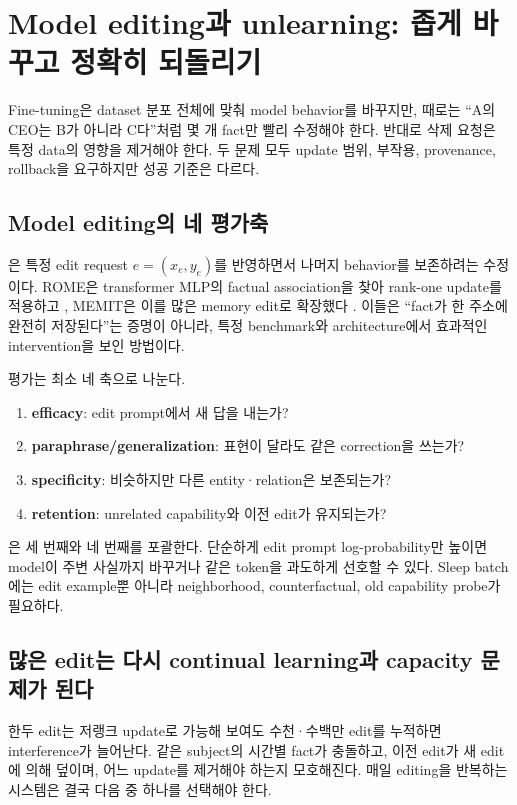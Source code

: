 \chapter{Model editing과 unlearning: 좁게 바꾸고 정확히 되돌리기}
\label{bg:chapter-editing-unlearning}

Fine-tuning은 dataset 분포 전체에 맞춰 model behavior를 바꾸지만, 때로는 ``A의 CEO는 B가 아니라
C다''처럼 몇 개 fact만 빨리 수정해야 한다. 반대로 삭제 요청은 특정 data의 영향을 제거해야 한다.
두 문제 모두 update 범위, 부작용, provenance, rollback을 요구하지만 성공 기준은 다르다.

\section{Model editing의 네 평가축}

은 특정 edit request $e=(x_e,y_e)$를 반영하면서 나머지 behavior를
보존하려는 수정이다. ROME은 transformer MLP의 factual association을 찾아 rank-one update를 적용하고
\parencite{meng2022rome}, MEMIT은 이를 많은 memory edit로 확장했다
\parencite{meng2022memit}. 이들은 ``fact가 한 주소에 완전히 저장된다''는 증명이 아니라, 특정
benchmark와 architecture에서 효과적인 intervention을 보인 방법이다.

평가는 최소 네 축으로 나눈다.

\begin{enumerate}
  \item \textbf{efficacy}: edit prompt에서 새 답을 내는가?
  \item \textbf{paraphrase/generalization}: 표현이 달라도 같은 correction을 쓰는가?
  \item \textbf{specificity}: 비슷하지만 다른 entity·relation은 보존되는가?
  \item \textbf{retention}: unrelated capability와 이전 edit가 유지되는가?
\end{enumerate}

은 세 번째와 네 번째를 포괄한다. 단순하게 edit prompt log-probability만
높이면 model이 주변 사실까지 바꾸거나 같은 token을 과도하게 선호할 수 있다. Sleep batch에는 edit
example뿐 아니라 neighborhood, counterfactual, old capability probe가 필요하다.

\section{많은 edit는 다시 continual learning과 capacity 문제가 된다}

한두 edit는 저랭크 update로 가능해 보여도 수천·수백만 edit를 누적하면 interference가 늘어난다.
같은 subject의 시간별 fact가 충돌하고, 이전 edit가 새 edit에 의해 덮이며, 어느 update를 제거해야 하는지
모호해진다. 매일 editing을 반복하는 시스템은 결국 다음 중 하나를 선택해야 한다.

